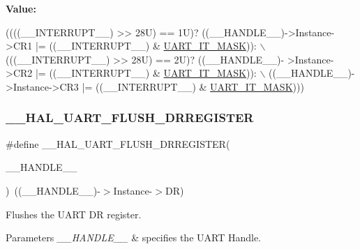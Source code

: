 {\bfseries Value\+:}
\begin{DoxyCode}
((((\_\_INTERRUPT\_\_) >> 28U) == 1U)? ((\_\_HANDLE\_\_)->Instance->CR1 |= ((\_\_INTERRUPT\_\_) & 
      \mbox{\hyperlink{group___u_a_r_t___exported___macros_ga869439269c26e8dee93d49b1c7e67448}{UART\_IT\_MASK}})): \(\backslash\)
                                                           (((\_\_INTERRUPT\_\_) >> 28U) == 2U)? ((\_\_HANDLE\_\_)-
      >Instance->CR2 |=  ((\_\_INTERRUPT\_\_) & \mbox{\hyperlink{group___u_a_r_t___exported___macros_ga869439269c26e8dee93d49b1c7e67448}{UART\_IT\_MASK}})): \(\backslash\)
                                                        ((\_\_HANDLE\_\_)->Instance->CR3 |= ((\_\_INTERRUPT\_\_) & 
      \mbox{\hyperlink{group___u_a_r_t___exported___macros_ga869439269c26e8dee93d49b1c7e67448}{UART\_IT\_MASK}})))
\end{DoxyCode}
\mbox{\label{group___u_a_r_t___exported___macros_gafc4f20cb0f29ba146c9bc14167c52744}} 
\subsubsection{\texorpdfstring{\+\_\+\+\_\+\+H\+A\+L\+\_\+\+U\+A\+R\+T\+\_\+\+F\+L\+U\+S\+H\+\_\+\+D\+R\+R\+E\+G\+I\+S\+T\+ER}{\_\_HAL\_UART\_FLUSH\_DRREGISTER}}
{\footnotesize\ttfamily \#define \+\_\+\+\_\+\+H\+A\+L\+\_\+\+U\+A\+R\+T\+\_\+\+F\+L\+U\+S\+H\+\_\+\+D\+R\+R\+E\+G\+I\+S\+T\+ER(\begin{DoxyParamCaption}\item[{}]{\+\_\+\+\_\+\+H\+A\+N\+D\+L\+E\+\_\+\+\_\+ }\end{DoxyParamCaption})~((\+\_\+\+\_\+\+H\+A\+N\+D\+L\+E\+\_\+\+\_\+)-\/$>$Instance-\/$>$DR)}



Flushes the U\+A\+RT DR register. 


\begin{DoxyParams}{Parameters}
{\em \+\_\+\+\_\+\+H\+A\+N\+D\+L\+E\+\_\+\+\_\+} & specifies the U\+A\+RT Handle. \\
\hline
\end{DoxyParams}
\mbox{\label{group___u_a_r_t___exported___macros_ga261fe8a2afe84ec048113654266c5bf6}} 
